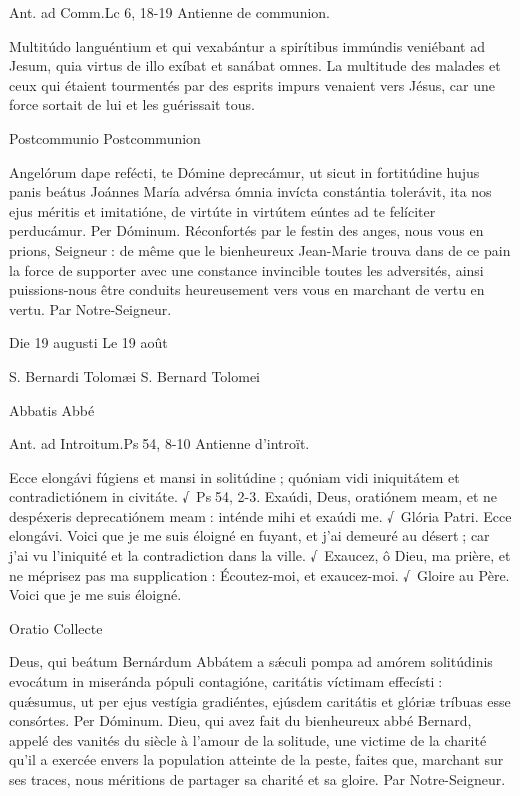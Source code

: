 \begin{paracol}{2}
Ant. ad Comm.\hfill Lc 6, 18-19
\switchcolumn
Antienne de communion.
\switchcolumn*

Multitúdo languéntium et qui vexabántur a spirítibus immúndis veniébant ad Jesum, quia virtus de illo exíbat et sanábat omnes.
\switchcolumn
La multitude des malades et ceux qui étaient tourmentés par des esprits impurs venaient vers Jésus, car une force sortait de lui et les guérissait tous.
\switchcolumn*

Postcommunio
\switchcolumn
Postcommunion
\switchcolumn*

Angelórum dape refécti, te Dómine  deprecámur, ut sicut in fortitúdine hujus panis beátus Joánnes María advérsa ómnia invícta constántia tolerávit, ita nos ejus méritis et imitatióne, de virtúte in virtútem eúntes ad te felíciter perducámur. Per Dóminum.
\switchcolumn
Réconfortés par le festin des anges, nous  vous en prions, Seigneur : de même que le bienheureux Jean-Marie trouva dans de ce pain la force de supporter avec une constance invincible toutes les adversités, ainsi puissions-nous être conduits heureusement vers vous en marchant de vertu en vertu. Par Notre-Seigneur.
\switchcolumn*

Die 19 augusti
\switchcolumn
Le 19 août
\switchcolumn*

S. Bernardi Tolomæi
\switchcolumn
S. Bernard Tolomei
\switchcolumn*

Abbatis
\switchcolumn
Abbé
\switchcolumn*

Ant. ad Introitum.\hfill Ps 54, 8-10
\switchcolumn
Antienne d’introït.
\switchcolumn*

Ecce elongávi fúgiens et mansi  in solitúdine ; quóniam vidi iniquitátem et contradictiónem in civitáte. √~Ps 54, 2-3. Exaúdi, Deus, oratiónem meam, et ne despéxeris deprecatiónem meam : inténde mihi et exaúdi me. √~Glória Patri. Ecce elongávi.
\switchcolumn
Voici que je me suis éloigné en fuyant,  et j’ai demeuré au désert ; car j’ai vu l’iniquité et la contradiction dans la ville. √~Exaucez, ô Dieu, ma prière, et ne méprisez pas ma supplication : Écoutez-moi, et exaucez-moi. √~Gloire au Père. Voici que je me suis éloigné.
\switchcolumn*

Oratio
\switchcolumn
Collecte
\switchcolumn*

Deus, qui beátum Bernárdum  Abbátem a sǽculi pompa ad amórem solitúdinis evocátum in miseránda pópuli contagióne, caritátis víctimam effecísti : quǽsumus, ut per ejus vestígia gradiéntes, ejúsdem caritátis et glóriæ tríbuas esse consórtes. Per Dóminum.
\switchcolumn
Dieu, qui avez fait du bienheureux abbé  Bernard, appelé des vanités du siècle à l’amour de la solitude, une victime de la charité qu’il a exercée envers la population atteinte de la peste, faites que, marchant sur ses traces, nous méritions de partager sa charité et sa gloire. Par Notre-Seigneur.
\switchcolumn*


\end{paracol}
